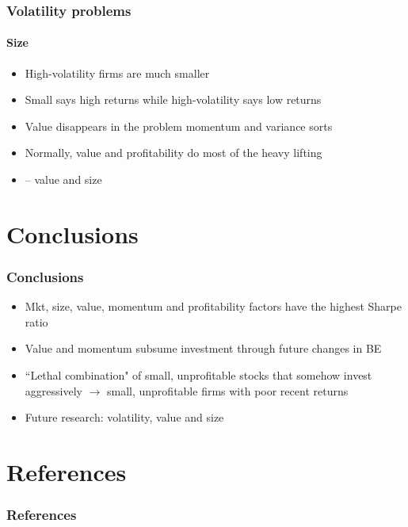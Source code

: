 \documentclass[notes]{beamer}  %
\begin{document}
\begin{frame} \frametitle{Volatility problems} \framesubtitle{Size}
  \begin{itemize}
    \item High-volatility firms are much smaller
    \item Small says high returns while high-volatility says low returns
    \item Value disappears in the problem momentum and variance sorts
    \item Normally, value and profitability do most of the heavy lifting
    \item \textcite{gerakos2017decomposing} -- value and size
  \end{itemize}
\end{frame}

\section{Conclusions}

\begin{frame} \frametitle{Conclusions}
  \begin{itemize}
    \item Mkt, size, value, momentum and profitability factors have the
    highest Sharpe ratio
    \item Value and momentum subsume investment through future changes in BE
    \item ``Lethal combination" of small, unprofitable stocks that somehow
    invest aggressively $\rightarrow$ small, unprofitable firms with poor
    recent returns
    \item Future research: volatility, value and size
  \end{itemize}
\end{frame}

\section{References}

\begin{frame}[allowframebreaks]
  \frametitle{References}
  \printbibliography
\end{frame}
\end{document}
